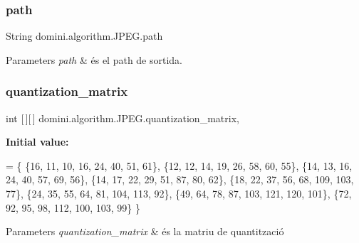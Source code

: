 \subsubsection{\texorpdfstring{path}{path}}
{\footnotesize\ttfamily String domini.\+algorithm.\+J\+P\+E\+G.\+path\hspace{0.3cm}{\ttfamily [package]}}


\begin{DoxyParams}{Parameters}
{\em path} & és el path de sortida. \\
\hline
\end{DoxyParams}
\mbox{\label{classdomini_1_1algorithm_1_1JPEG_a7c95eb140dbe185a31b402d48ec17a66}} 
\subsubsection{\texorpdfstring{quantization\+\_\+matrix}{quantization\_matrix}}
{\footnotesize\ttfamily int \mbox{[}$\,$\mbox{]}\mbox{[}$\,$\mbox{]} domini.\+algorithm.\+J\+P\+E\+G.\+quantization\+\_\+matrix\hspace{0.3cm}{\ttfamily [static]}, {\ttfamily [private]}}

{\bfseries Initial value\+:}
\begin{DoxyCode}
=
    \{
        \{16, 11, 10, 16, 24, 40, 51, 61\},
        \{12, 12, 14, 19, 26, 58, 60, 55\},
        \{14, 13, 16, 24, 40, 57, 69, 56\},
        \{14, 17, 22, 29, 51, 87, 80, 62\},
        \{18, 22, 37, 56, 68, 109, 103, 77\},
        \{24, 35, 55, 64, 81, 104, 113, 92\},
        \{49, 64, 78, 87, 103, 121, 120, 101\},
        \{72, 92, 95, 98, 112, 100, 103, 99\}
    \}
\end{DoxyCode}

\begin{DoxyParams}{Parameters}
{\em quantization\+\_\+matrix} & és la matriu de quantització \\
\hline
\end{DoxyParams}
\mbox{\label{classdomini_1_1algorithm_1_1JPEG_a7d3829cbffd758c087341a8da13dd2ca}} 
